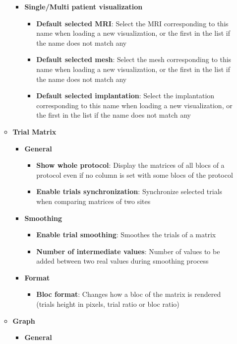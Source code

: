 \documentclass[a4paper]{article}
\begin{document}
\begin{itemize}
\begin{itemize}
\begin{itemize}
\begin{itemize}
\end{itemize}
\item \textbf{Single/Multi patient visualization}
\begin{itemize}
\item \textbf{Default selected MRI}: Select the MRI corresponding to this name when loading a new visualization, or the first in the list if the name does not match any
\item \textbf{Default selected mesh}: Select the mesh corresponding to this name when loading a new visualization, or the first in the list if the name does not match any
\item \textbf{Default selected implantation}: Select the implantation corresponding to this name when loading a new visualization, or the first in the list if the name does not match any
\end{itemize}
\end{itemize}
\item \textbf{Trial Matrix}
\begin{itemize}
\item \textbf{General}
\begin{itemize}
\item \textbf{Show whole protocol}: Display the matrices of all blocs of a protocol even if no column is set with some blocs of the protocol
\item \textbf{Enable trials synchronization}: Synchronize selected trials when comparing matrices of two sites
\end{itemize}
\item \textbf{Smoothing}
\begin{itemize}
\item \textbf{Enable trial smoothing}: Smoothes the trials of a matrix
\item \textbf{Number of intermediate values}: Number of values to be added between two real values during smoothing process
\end{itemize}
\item \textbf{Format}
\begin{itemize}
\item \textbf{Bloc format}: Changes how a bloc of the matrix is rendered (trials height in pixels, trial ratio or bloc ratio)
\end{itemize}
\end{itemize}
\item \textbf{Graph}
\begin{itemize}
\item \textbf{General}

\end{itemize}
\end{itemize}
\end{itemize}
\end{document}
